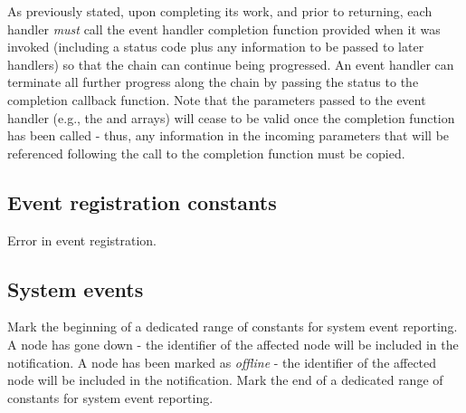 \adviceuserstart
As previously stated, upon completing its work, and prior to returning, each handler \textit{must} call the event handler completion function provided when it was invoked (including a status code plus any information to be passed to later handlers) so that the chain can continue being progressed. An event handler can terminate all further progress along the chain by passing the  status to the completion callback function. Note that the parameters passed to the event handler (e.g., the  and  arrays) will cease to be valid once the completion function has been called - thus, any information in the incoming parameters that will be referenced following the call to the completion function must be copied.
\adviceuserend

\subsection{Event registration constants}
\label{api:struct:constants:event}

\begin{constantdesc}
%
Error in event registration.
%
\end{constantdesc}

\subsection{System events}
\label{api:struct:sys:event}

\begin{constantdesc}
%
Mark the beginning of a dedicated range of constants for system event reporting.
%
A node has gone down - the identifier of the affected node will be included in the notification.
%
A node has been marked as \emph{offline} - the identifier of the affected node will be included in the notification.
%
Mark the end of a dedicated range of constants for system event reporting.
%
\end{constantdesc}


